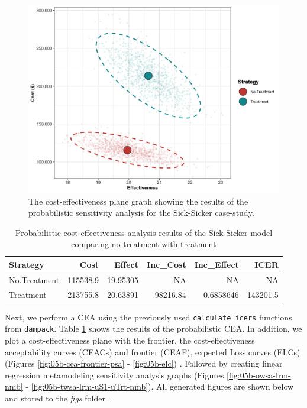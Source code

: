 \documentclass[]{book}
\begin{document}
\begin{figure}

{\centering \includegraphics[width=1\linewidth]{../figs/05b_cea_plane_scatter} 

}

\caption{The cost-effectiveness plane graph showing the results of the probabilistic sensitivity analysis for the Sick-Sicker case-study.}\label{fig:05b-CEAplane}
\end{figure}

\begin{table}[t]

\caption{\label{tab:df-cea-prob}Probabilistic cost-effectiveness analysis results of the Sick-Sicker model comparing no treatment with treatment}
\centering
\begin{tabular}{l|r|r|r|r|r}
\hline
Strategy & Cost & Effect & Inc\_Cost & Inc\_Effect & ICER\\
\hline
No.Treatment & 115538.9 & 19.95305 & NA & NA & NA\\
\hline
Treatment & 213755.8 & 20.63891 & 98216.84 & 0.6858646 & 143201.5\\
\hline
\end{tabular}
\end{table}

Next, we perform a CEA using the previously used \texttt{calculate\_icers} functions from \texttt{dampack}. Table \ref{tab:df-cea-prob} shows the results of the probabilistic CEA. In addition, we plot a cost-effectiveness plane with the frontier, the cost-effectiveness acceptability curves (CEACs) and frontier (CEAF), expected Loss curves (ELCs) (Figures \ref{fig:05b-cea-frontier-psa} - \ref{fig:05b-elc}) \citep{Alarid-Escudero2019}. Followed by creating linear regression metamodeling sensitivity analysis graphs (Figures \ref{fig:05b-owsa-lrm-nmb} - \ref{fig:05b-twsa-lrm-uS1-uTrt-nmb})\citep{Jalal2013}. All generated figures are shown below and stored to the \emph{figs} folder .
\end{document}
